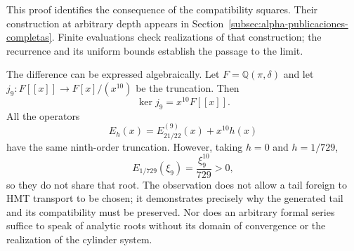 This proof identifies the consequence of the compatibility squares.
Their construction at arbitrary depth appears in
Section~\ref{subsec:alpha-publicaciones-completas}. Finite
evaluations check realizations of that construction; the recurrence
and its uniform bounds establish the passage to the limit.

The difference can be expressed algebraically. Let
\(F=\mathbb Q(\pi,\delta)\) and let
\(j_9:F[[x]]\to F[x]/(x^{10})\) be the truncation. Then
\[
 \ker j_9=x^{10}F[[x]].
\]
All the operators
\[
 E_h(x)=E_{21/22}^{(9)}(x)+x^{10}h(x)
\]
have the same ninth-order truncation. However, taking
\(h=0\) and \(h=1/729\),
\[
 E_{1/729}(\xi_9)=\frac{\xi_9^{10}}{729}>0,
\]
so they do not share that root. The observation does not allow a
tail foreign to HMT transport to be chosen; it demonstrates precisely why the generated
tail and its compatibility must be preserved. Nor does an arbitrary formal
series suffice to speak of analytic roots without its domain of
convergence or the realization of the cylinder system.

